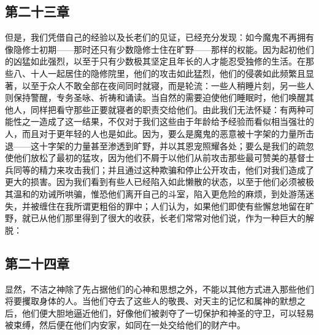 \subsection{第二十三章}

\par

但是，我们凭借自己的经验以及长老们的见证，已经充分发现：如今魔鬼不再拥有像隐修士初期——那时还只有少数隐修士住在旷野——那样的权能。因为起初他们的凶猛如此强烈，以至于只有少数极其坚定且年长的人才能忍受独修的生活。在那些八、十人一起居住的隐修院里，他们的攻击如此猛烈，他们的侵袭如此频繁且显著，以至于众人不敢全部在夜间同时就寝，而是轮流：一些人稍睡片刻，另一些人则保持警醒，专务圣咏、祈祷和诵读。当自然的需要迫使他们睡眠时，他们唤醒其他人，同样把看守那些正要就寝者的职责交给他们。由此我们无法怀疑：有两种可能性之一造成了这一结果，不仅对于我们这些由于年龄给予经验而看似相当强壮的人，而且对于更年轻的人也是如此。因为，要么是魔鬼的恶意被十字架的力量所击退——这十字架的力量甚至渗透到旷野，并以其恩宠照耀各处；要么是我们的疏忽使他们放松了最初的猛攻，因为他们不屑于以他们从前攻击那些最可赞美的基督士兵同等的精力来攻击我们；并且通过这种欺骗和停止公开攻击，他们对我们造成了更大的损害。因为我们看到有些人已经陷入如此懒散的状态，以至于他们必须被极其温和的劝诫所哄骗，惟恐他们离开自己的斗室，陷入更危险的麻烦，到处游荡迷失，并被缠住在我所谓更粗俗的罪中；人们认为，如果他们即使有些懈怠地留在旷野，就已从他们那里得到了很大的收获，长老们常常对他们说，作为一种巨大的解脱：\par


\subsection{第二十四章}

\par

显然，不洁之神除了先占据他们的心神和思想之外，不能以其他方式进入那些他们将要攫取身体的人。当他们夺去了这些人的敬畏、对天主的记忆和属神的默想之后，他们便大胆地逼近他们，好像他们被剥夺了一切保护和神圣的守卫，可以轻易被束缚，然后便在他们内安家，如同在一处交给他们的财产中。\par


